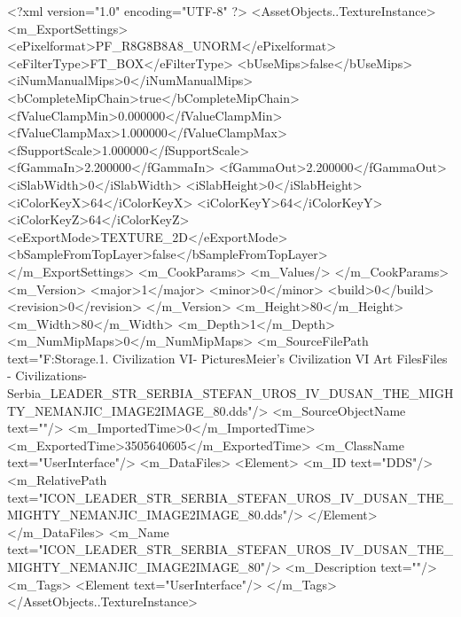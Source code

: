 <?xml version="1.0" encoding="UTF-8" ?>
<AssetObjects..TextureInstance>
	<m_ExportSettings>
		<ePixelformat>PF_R8G8B8A8_UNORM</ePixelformat>
		<eFilterType>FT_BOX</eFilterType>
		<bUseMips>false</bUseMips>
		<iNumManualMips>0</iNumManualMips>
		<bCompleteMipChain>true</bCompleteMipChain>
		<fValueClampMin>0.000000</fValueClampMin>
		<fValueClampMax>1.000000</fValueClampMax>
		<fSupportScale>1.000000</fSupportScale>
		<fGammaIn>2.200000</fGammaIn>
		<fGammaOut>2.200000</fGammaOut>
		<iSlabWidth>0</iSlabWidth>
		<iSlabHeight>0</iSlabHeight>
		<iColorKeyX>64</iColorKeyX>
		<iColorKeyY>64</iColorKeyY>
		<iColorKeyZ>64</iColorKeyZ>
		<eExportMode>TEXTURE_2D</eExportMode>
		<bSampleFromTopLayer>false</bSampleFromTopLayer>
	</m_ExportSettings>
	<m_CookParams>
		<m_Values/>
	</m_CookParams>
	<m_Version>
		<major>1</major>
		<minor>0</minor>
		<build>0</build>
		<revision>0</revision>
	</m_Version>
	<m_Height>80</m_Height>
	<m_Width>80</m_Width>
	<m_Depth>1</m_Depth>
	<m_NumMipMaps>0</m_NumMipMaps>
	<m_SourceFilePath text="F:\Mod Storage\2.1. Civilization VI\Mods\Archive - Pictures\Sid Meier's Civilization VI Art Files\Art Files - Civilizations\Civilization - Serbia\ICON_LEADER_STR_SERBIA_STEFAN_UROS_IV_DUSAN_THE_MIGHTY_NEMANJIC_IMAGE2IMAGE_80.dds"/>
	<m_SourceObjectName text=""/>
	<m_ImportedTime>0</m_ImportedTime>
	<m_ExportedTime>3505640605</m_ExportedTime>
	<m_ClassName text="UserInterface"/>
	<m_DataFiles>
		<Element>
			<m_ID text="DDS"/>
			<m_RelativePath text="ICON_LEADER_STR_SERBIA_STEFAN_UROS_IV_DUSAN_THE_MIGHTY_NEMANJIC_IMAGE2IMAGE_80.dds"/>
		</Element>
	</m_DataFiles>
	<m_Name text="ICON_LEADER_STR_SERBIA_STEFAN_UROS_IV_DUSAN_THE_MIGHTY_NEMANJIC_IMAGE2IMAGE_80"/>
	<m_Description text=""/>
	<m_Tags>
		<Element text="UserInterface"/>
	</m_Tags>
</AssetObjects..TextureInstance>


